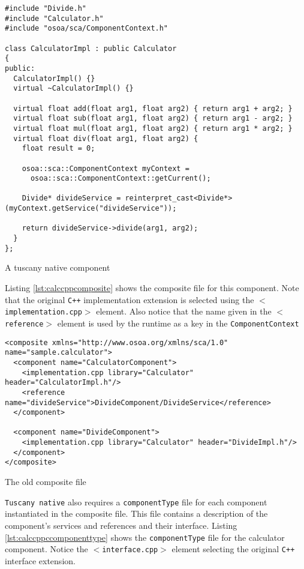 \begin{listing}
\begin{verbatim}
#include "Divide.h"
#include "Calculator.h"
#include "osoa/sca/ComponentContext.h"

class CalculatorImpl : public Calculator
{
public:
  CalculatorImpl() {}
  virtual ~CalculatorImpl() {}

  virtual float add(float arg1, float arg2) { return arg1 + arg2; }
  virtual float sub(float arg1, float arg2) { return arg1 - arg2; }
  virtual float mul(float arg1, float arg2) { return arg1 * arg2; }
  virtual float div(float arg1, float arg2) {
    float result = 0;

    osoa::sca::ComponentContext myContext = 
      osoa::sca::ComponentContext::getCurrent();

    Divide* divideService = reinterpret_cast<Divide*>(myContext.getService("divideService"));

    return divideService->divide(arg1, arg2);
  }
};
\end{verbatim}
\caption{A tuscany native component}
\label{lst:calccpp}
\end{listing}

Listing \ref{lst:calccppcomposite} shows the composite file for this component. Note that
the original \texttt{C++} implementation extension is selected using the \texttt{$<$implementation.cpp$>$}
element. Also notice that the name given in the \texttt{$<$reference$>$} element is used by
the runtime as a key in the \texttt{ComponentContext}

\begin{listing}
\begin{verbatim}
<composite xmlns="http://www.osoa.org/xmlns/sca/1.0" name="sample.calculator">
  <component name="CalculatorComponent">
    <implementation.cpp library="Calculator" header="CalculatorImpl.h"/>
    <reference name="divideService">DivideComponent/DivideService</reference>
  </component>
        
  <component name="DivideComponent">
    <implementation.cpp library="Calculator" header="DivideImpl.h"/>
  </component>
</composite>
\end{verbatim}
\caption{The old composite file}
\label{lst:calccppcomposite}
\end{listing}

\texttt{Tuscany native} also requires a \texttt{componentType} file for each component instantiated in the composite file.
This file contains a description of the component's services and references and their interface. Listing
\ref{lst:calccppccomponenttype} shows the \texttt{componentType} file for the calculator component. Notice
the \texttt{$<$interface.cpp$>$} element selecting the original \texttt{C++} interface extension.

